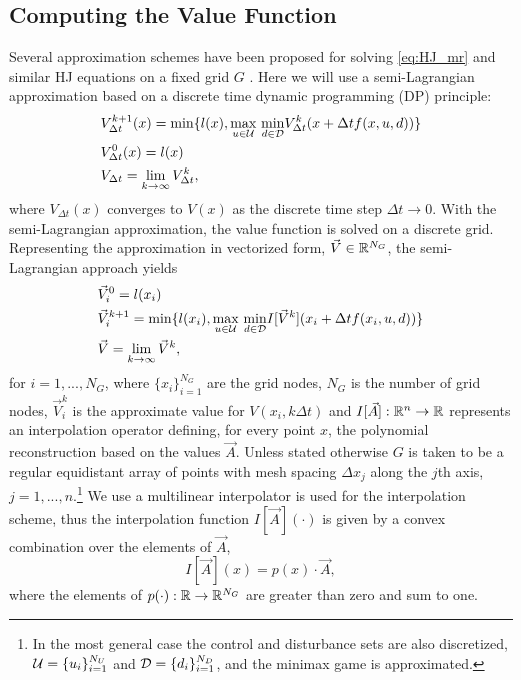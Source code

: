 \subsection{Computing the Value Function}
Several approximation schemes have been proposed for solving \eqref{eq:HJ_mr} and similar HJ equations on a fixed grid $G$ \cite{Bardi1999, Falcone1994, Mitchell2005}. Here we will use a semi-Lagrangian approximation based on a discrete time dynamic programming (DP) principle:
%
\begin{subequations}
\begin{align}
&V_{\Delta t}^{k+1}(x) = \min\{l(x),  \underset{u\in\mathcal{U}}{\max}\text{ }\underset{ d\in\mathcal{D}}{\min} V^{k}_{\Delta t}(x+\Delta t f(x,u,d))\}\\
&V_{\Delta t}^{0}(x) = l(x)\\
&V_{\Delta t} = \lim_{k\rightarrow \infty} V^{k}_{\Delta t},
\end{align}
\end{subequations}%
\noindent where $V_{\Delta t}(x)$ converges to $V(x)$ as the discrete time step $\Delta t \rightarrow 0$. With the semi-Lagrangian approximation, the value function is solved on a discrete grid. Representing the approximation in vectorized form, $\vec{V} \in \mathbb{R}^{N_G}$, the semi-Lagrangian approach yields \ 
\begin{subequations} \label{eq:dp_min_dist}
\begin{align}
&\vec{V}_{i}^{0} = l(x_i)\\
&\vec{V}_{i}^{k+1} = \min\{l(x_i),  \underset{u\in\mathcal{U}}{\max}\text{ }\underset{ d\in\mathcal{D}}{\min} I[\vec{V}^{k}](x_i+\Delta t f(x_i,u,d)) \label{eq:dp_min_dist_b}\}\\
&\vec{V} = \lim_{k\rightarrow \infty} \vec{V}^{k},
\end{align}
\end{subequations}%
\noindent for  $i=1, ..., N_G$, where $\{x_i\}_{i=1}^{N_G}$ are the grid nodes, $N_G$ is the number of grid nodes, $\vec{V}_i^k$ is the approximate value for $V(x_i, k \Delta t)$ and ${I[\vec{A}]:\mathbb{R}^n \rightarrow \mathbb{R}}$ represents an interpolation operator defining, for every point $x$, the polynomial reconstruction based on the values $\vec{A}$. Unless stated otherwise $G$ is taken to be a regular equidistant array of points with mesh spacing $\Delta x_j$ along the $j$th axis, $j=1,...,n$.\footnote{In the most general case the control and disturbance sets are also discretized, $\mathcal{U}=\{u_i\}_{i=1}^{N_U}$ and $\mathcal{D}=\{d_i\}_{i=1}^{N_D}$, and the minimax game is approximated.} We use a multilinear interpolator is used for the interpolation scheme, thus the interpolation function $I[\vec{A}](\cdot)$ is given by a convex combination over the elements of $\vec{A}$,
\begin{equation}
I[\vec{A}](x)= p(x)\cdot \vec{A},
\end{equation}%
\noindent where the elements of ${p(\cdot): \mathbb{R} \rightarrow \mathbb{R}^{N_G}}$ are greater than zero and sum to one. 

